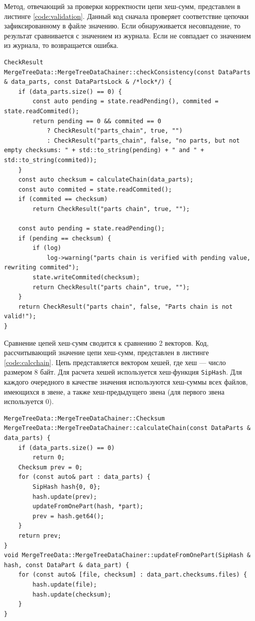 Метод, отвечающий за проверки корректности цепи хеш-сумм, представлен в листинге \ref{code:validation}. Данный код сначала проверяет соответствие цепочки зафиксированному в файле значению. Если обнаруживается несовпадение, то результат сравнивается с значением из журнала. Если не совпадает со значением из журнала, то возвращается ошибка.

\pagebreak

\begin{lstlisting}[label=code:validation, caption={Валидация цепи хеш-сумм.}]
CheckResult MergeTreeData::MergeTreeDataChainer::checkConsistency(const DataParts & data_parts, const DataPartsLock & /*lock*/) {
    if (data_parts.size() == 0) {
        const auto pending = state.readPending(), commited = state.readCommited();
        return pending == 0 && commited == 0
            ? CheckResult("parts_chain", true, "")
            : CheckResult("parts_chain", false, "no parts, but not empty checksums: " + std::to_string(pending) + " and " + std::to_string(commited));
    }
    const auto checksum = calculateChain(data_parts);
    const auto commited = state.readCommited();
    if (commited == checksum)
        return CheckResult("parts chain", true, "");

    const auto pending = state.readPending();
    if (pending == checksum) {
        if (log)
            log->warning("parts chain is verified with pending value, rewriting commited");
        state.writeCommited(checksum);
        return CheckResult("parts chain", true, "");
    }
    return CheckResult("parts chain", false, "Parts chain is not valid!");
}
\end{lstlisting}

Сравнение цепей хеш-сумм сводится к сравнению 2 векторов. Код, рассчитывающий значение цепи хеш-сумм, представлен в листинге \ref{code:calcchain}. Цепь представляется вектором хешей, где хеш --- число размером 8 байт. Для расчета хешей используется хеш-функция \texttt{SipHash}. Для каждого очередного в качестве значения используются хеш-суммы всех файлов, имеющихся в звене, а также хеш-предыдущего звена (для первого звена используется 0).

\pagebreak

\begin{lstlisting}[label=code:calcchain, caption={Расчет цепи хеш-сумм.}]
MergeTreeData::MergeTreeDataChainer::Checksum
MergeTreeData::MergeTreeDataChainer::calculateChain(const DataParts & data_parts) {
    if (data_parts.size() == 0)
        return 0;
    Checksum prev = 0;
    for (const auto& part : data_parts) {
        SipHash hash{0, 0};
        hash.update(prev);
        updateFromOnePart(hash, *part);
        prev = hash.get64();
    }
    return prev;
}
void MergeTreeData::MergeTreeDataChainer::updateFromOnePart(SipHash & hash, const DataPart & data_part) {
    for (const auto& [file, checksum] : data_part.checksums.files) {
        hash.update(file);
        hash.update(checksum);
    }
}
\end{lstlisting}


